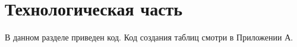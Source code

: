 \chapter{Технологическая часть}
\label{cha:impl}

В данном разделе приведен код. Код создания таблиц смотри в Приложении А.


%
%
